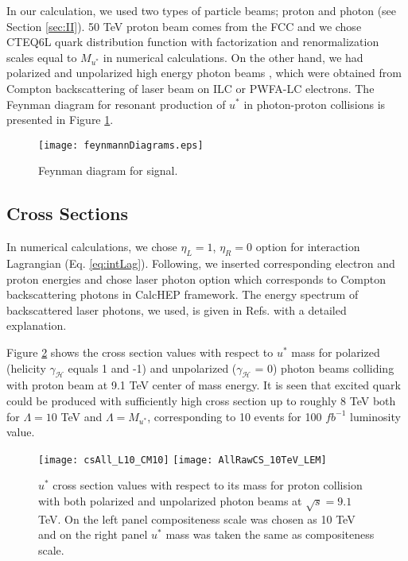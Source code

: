 \documentclass{appolb}
\begin{document}
In our calculation, we used two types of particle beams; proton and photon (see Section \ref{sec:II}). 50 TeV proton beam comes from the FCC and we chose  CTEQ6L quark distribution function \cite{pumplin2002,stump2003}  with factorization and renormalization scales equal to $M_{u^*}$  in numerical calculations.  On the other hand, we had polarized and unpolarized high energy photon beams \cite{borden1993,dangelo2000}, which were obtained from Compton backscattering \cite{ginzburg1983,ginzburg1984,telnov1990} of laser beam  on ILC or PWFA-LC electrons.  The Feynman diagram for resonant production of $u^*$ in photon-proton collisions is presented in Figure \ref{fig:feynsignal}.   

\begin{figure}[h!]
	\centering
	\texttt{[image: feynmannDiagrams.eps]}%
	\caption{Feynman diagram for signal.}
	\label{fig:feynsignal} 
\end{figure}

\subsection{\label{subsec:cross}Cross Sections} 

In numerical calculations, we chose $\eta_{L} = 1$, $\eta_{R} = 0$ option for interaction Lagrangian   (Eq. \ref{eq:intLag}). Following, we inserted corresponding  electron and proton energies and chose laser photon option which corresponds to Compton backscattering photons  in CalcHEP framework. The energy spectrum of  backscattered laser photons, we used, is given in Refs. \cite{ginzburg1983,ginzburg1984,telnov1990,pukhov2012calchep} with a detailed explanation. 


Figure \ref{fig:sc9100} shows the cross section values with respect to $u^*$ mass for polarized (helicity $\gamma_{\mathcal{H}}$  equals 1 and -1) and unpolarized ($\gamma_{\mathcal{H}}$  = 0) photon beams colliding with proton beam at 9.1 TeV center of mass energy.  It is seen that excited quark could be produced with sufficiently high  cross section up to roughly 8 TeV both for $\Lambda = 10$ TeV and $\Lambda = M_{u^*}$, corresponding to 10 events for 100 $fb^{-1}$ luminosity value.

\begin{figure}[h!]
	\centering
	
	\texttt{[image: csAll\_L10\_CM10]}
	\texttt{[image: AllRawCS\_10TeV\_LEM]}
	
	\caption{\label{fig:sc9100} $u^*$ cross section values  with respect to  its mass  for proton collision with both polarized and unpolarized photon beams at $\sqrt{s} = 9.1$ TeV.  On the left panel compositeness scale was chosen as 10 TeV and on the right panel $u^*$ mass was taken the same as compositeness scale.}
\end{figure}	
\end{document}
